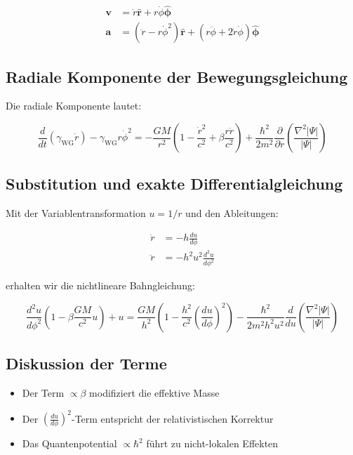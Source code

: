 \begin{align}
\mathbf{v} &= \dot{r}\hat{\mathbf{r}} + r\dot{\phi}\hat{\boldsymbol{\phi}} \\
\mathbf{a} &= (\ddot{r}-r\dot{\phi}^2)\hat{\mathbf{r}} + (r\ddot{\phi}+2\dot{r}\dot{\phi})\hat{\boldsymbol{\phi}}
\end{align}

\subsection{Radiale Komponente der Bewegungsgleichung}
Die radiale Komponente lautet:

\begin{equation}
\frac{d}{dt}(\gamma_{\mathrm{WG}}\dot{r}) - \gamma_{\mathrm{WG}}r\dot{\phi}^2 = -\frac{GM}{r^2}\left(1-\frac{\dot{r}^2}{c^2}+\beta\frac{r\ddot{r}}{c^2}\right) + \frac{\hbar^2}{2m^2}\frac{\partial}{\partial r}\left(\frac{\nabla^2|\Psi|}{|\Psi|}\right)
\end{equation}

\subsection{Substitution und exakte Differentialgleichung}
Mit der Variablentransformation $u = 1/r$ und den Ableitungen:

\begin{align}
\dot{r} &= -h\frac{du}{d\phi} \\
\ddot{r} &= -h^2u^2\frac{d^2u}{d\phi^2}
\end{align}

erhalten wir die nichtlineare Bahngleichung:

\begin{equation}
\boxed{
\frac{d^2u}{d\phi^2}\left(1-\beta\frac{GM}{c^2}u\right) + u = \frac{GM}{h^2}\left(1-\frac{h^2}{c^2}\left(\frac{du}{d\phi}\right)^2\right) - \frac{\hbar^2}{2m^2h^2u^2}\frac{d}{du}\left(\frac{\nabla^2|\Psi|}{|\Psi|}\right)
}
\label{eq:master}
\end{equation}

\subsection{Diskussion der Terme}
\begin{itemize}
\item Der Term $\propto \beta$ modifiziert die effektive Masse
\item Der $(\frac{du}{d\phi})^2$-Term entspricht der relativistischen Korrektur
\item Das Quantenpotential $\propto \hbar^2$ führt zu nicht-lokalen Effekten
\end{itemize}

